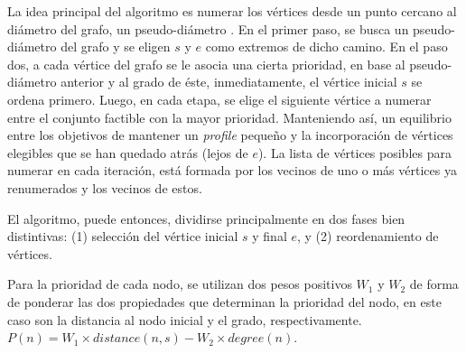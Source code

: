La idea principal del algoritmo es numerar los vértices desde un punto cercano al diámetro del grafo, un pseudo-diámetro%
. En el primer paso, se busca un pseudo-diámetro del grafo y se eligen $s$ y $e$ como extremos de dicho camino. En el paso dos, a cada vértice del grafo se le asocia una cierta prioridad, en base al pseudo-diámetro anterior y al grado de éste, inmediatamente, el vértice inicial $s$ se ordena primero. Luego, en cada etapa, se elige el siguiente vértice a numerar entre el conjunto factible con la mayor prioridad. Manteniendo así, un equilibrio entre los objetivos de mantener un \textit{profile} pequeño y la incorporación de vértices elegibles que se han quedado atrás (lejos de $e$). La lista de vértices posibles para numerar en cada iteración, está formada por los vecinos de uno o más vértices ya renumerados y los vecinos de estos.
 
 El algoritmo, puede entonces, dividirse principalmente en dos fases bien distintivas: (1) selección del vértice inicial $s$ y final $e$, y (2) reordenamiento de vértices.%

Para la prioridad de cada nodo, se utilizan dos pesos positivos $W_1$ y $W_2$ de forma de ponderar las dos propiedades que determinan la prioridad del nodo, en este caso son la distancia al nodo inicial y el grado, respectivamente. 
$P(n) = W_1\times distance(n,s) - W_2\times degree(n)$.

